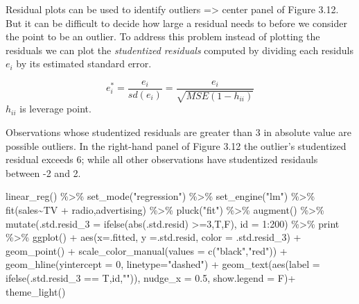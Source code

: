 \documentclass[
  letterpaper,
  DIV=11,
  numbers=noendperiod]{scrreprt}
\newenvironment{Shaded}{\begin{snugshade}}{\end{snugshade}}
\newcommand{\AttributeTok}[1]{\textcolor[rgb]{0.65,0.35,0.00}{#1}}
\newcommand{\DecValTok}[1]{\textcolor[rgb]{0.47,0.16,0.63}{#1}}
\newcommand{\FloatTok}[1]{\textcolor[rgb]{0.65,0.35,0.00}{#1}}
\newcommand{\FunctionTok}[1]{\textcolor[rgb]{0.02,0.16,0.49}{#1}}
\newcommand{\NormalTok}[1]{\textcolor[rgb]{0.33,0.33,0.33}{#1}}
\newcommand{\SpecialCharTok}[1]{\textcolor[rgb]{0.00,0.46,0.62}{#1}}
\newcommand{\StringTok}[1]{\textcolor[rgb]{0.00,0.50,0.00}{#1}}
\begin{document}
Residual plots can be used to identify outliers =\textgreater{} center
panel of Figure 3.12. But it can be difficult to decide how large a
residual needs to before we consider the point to be an outlier. To
address this problem instead of plotting the residuals we can plot the
\emph{studentized residuals} computed by dividing each residuls \(e_i\)
by its estimated standard error.

\[
e_i^*=\frac{e_i}{sd(e_i)} = \frac{e_i}{\sqrt{MSE(1-h_{ii})}}
\] \(h_{ii}\) is leverage point.

Observations whose studentized residuals are greater than 3 in absolute
value are possible outliers. In the right-hand panel of Figure 3.12 the
outlier's studentized residual exceeds 6; while all other observations
have studentized residauls between -2 and 2.

\begin{Shaded}
\begin{Highlighting}[]
\FunctionTok{linear\_reg}\NormalTok{() }\SpecialCharTok{\%\textgreater{}\%} 
  \FunctionTok{set\_mode}\NormalTok{(}\StringTok{"regression"}\NormalTok{) }\SpecialCharTok{\%\textgreater{}\%} 
  \FunctionTok{set\_engine}\NormalTok{(}\StringTok{"lm"}\NormalTok{) }\SpecialCharTok{\%\textgreater{}\%} 
  \FunctionTok{fit}\NormalTok{(sales}\SpecialCharTok{\textasciitilde{}}\NormalTok{TV }\SpecialCharTok{+}\NormalTok{ radio,advertising) }\SpecialCharTok{\%\textgreater{}\%} 
  \FunctionTok{pluck}\NormalTok{(}\StringTok{"fit"}\NormalTok{) }\SpecialCharTok{\%\textgreater{}\%} 
  \FunctionTok{augment}\NormalTok{() }\SpecialCharTok{\%\textgreater{}\%} 
  \FunctionTok{mutate}\NormalTok{(}\AttributeTok{.std.resid\_3 =} \FunctionTok{ifelse}\NormalTok{(}\FunctionTok{abs}\NormalTok{(.std.resid) }\SpecialCharTok{\textgreater{}=}\DecValTok{3}\NormalTok{,T,F), }\AttributeTok{id =} \DecValTok{1}\SpecialCharTok{:}\DecValTok{200}\NormalTok{) }\SpecialCharTok{\%\textgreater{}\%} 
\NormalTok{  print }\SpecialCharTok{\%\textgreater{}\%} 
  \FunctionTok{ggplot}\NormalTok{() }\SpecialCharTok{+} \FunctionTok{aes}\NormalTok{(}\AttributeTok{x=}\NormalTok{.fitted, }\AttributeTok{y =}\NormalTok{.std.resid, }\AttributeTok{color =}\NormalTok{ .std.resid\_3) }\SpecialCharTok{+} \FunctionTok{geom\_point}\NormalTok{() }\SpecialCharTok{+} \FunctionTok{scale\_color\_manual}\NormalTok{(}\AttributeTok{values =} \FunctionTok{c}\NormalTok{(}\StringTok{"black"}\NormalTok{,}\StringTok{"red"}\NormalTok{)) }\SpecialCharTok{+} 
  \FunctionTok{geom\_hline}\NormalTok{(}\AttributeTok{yintercept =} \DecValTok{0}\NormalTok{, }\AttributeTok{linetype=}\StringTok{"dashed"}\NormalTok{) }\SpecialCharTok{+}
  \FunctionTok{geom\_text}\NormalTok{(}\FunctionTok{aes}\NormalTok{(}\AttributeTok{label =} \FunctionTok{ifelse}\NormalTok{(.std.resid\_3 }\SpecialCharTok{==}\NormalTok{ T,id,}\StringTok{""}\NormalTok{)), }\AttributeTok{nudge\_x =} \FloatTok{0.5}\NormalTok{, }\AttributeTok{show.legend =}\NormalTok{ F)}\SpecialCharTok{+} \FunctionTok{theme\_light}\NormalTok{() }
\end{Highlighting}
\end{Shaded}
\end{document}
